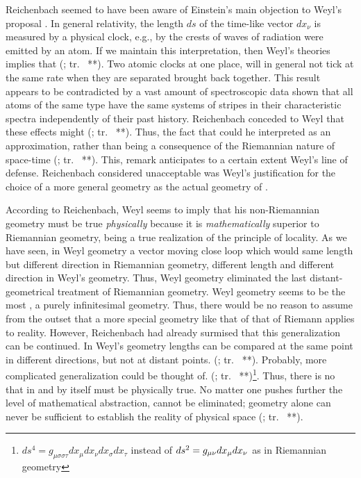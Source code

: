 \documentclass[draft]{article}
\newcommand{\rhp}[2]{(\cite[#1]{Reichenbach1920a}; tr.\ \citeyear{Reichenbach1969} #2)\xspace}
\begin{document}
Reichenbach seemed to have been aware of Einstein's main objection to Weyl's proposal \citep[see]{Einstein1918b}. In general relativity, the length $ds$ of the time-like vector $dx_\nu$ is measured by a physical clock, e.g., by the crests of waves of radiation were emitted by an atom. If we maintain this interpretation, then Weyl's theories implies that  \rhp{**}{**}. Two atomic clocks at one place, will in general not tick at the same rate when they are separated brought back together. This result appears to be contradicted by a vast amount of spectroscopic data shown that all atoms of the same type have the same systems of stripes in their characteristic spectra independently of their past history. Reichenbach conceded to Weyl that these effects might  \rhp{**}{**}. Thus, the fact that  could he interpreted as an approximation, rather than being a consequence of the Riemannian nature of space-time \rhp{**}{**}. This, remark anticipates to a certain extent Weyl's line of defense. Reichenbach considered unacceptable was Weyl's justification for the choice of a more general geometry as the actual geometry of \spti.

According to Reichenbach, Weyl seems to imply that his non-Riemannian geometry must be true \emph{physically} because it is \emph{mathematically} superior to Riemannian geometry, being a true realization of the principle of locality. As we have seen, in Weyl geometry a vector moving close loop which would same length but different direction in Riemannian geometry, different length and different direction in Weyl's geometry. Thus, Weyl geometry eliminated the last distant-geometrical treatment of Riemannian geometry. Weyl geometry seems to be the most , a purely infinitesimal geometry. Thus, there would be no reason to assume from the outset that a more special geometry like that of that of Riemann applies to reality. However, Reichenbach had already surmised that this generalization can be continued. In Weyl's geometry lengths can be compared at the same point in different directions, but not at distant points.  \rhp{**}{**}. Probably, more complicated generalization could be thought of.  \rhp{**}{**}\footnote{$d s^{4}=g_{\mu \sigma \sigma \tau} d x_{\mu} d x_{\nu} d x_{\sigma} d x_{\tau}$ instead of $d s^{2}=g_{\mu\nu} d x_{\mu} d x_{\nu}$ as in Riemannian geometry}. Thus, there is no  that in and by itself must be physically true. No matter one pushes further the level of mathematical abstraction,  cannot be eliminated; geometry alone can never be sufficient to establish the reality of physical space \rhp{**}{**}. 
\end{document}
